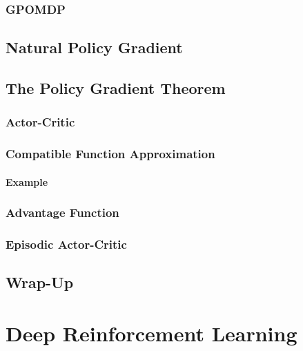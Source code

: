 		\subsection{GPOMDP} %

	\section{Natural Policy Gradient} %

	\section{The Policy Gradient Theorem} %

		\subsection{Actor-Critic} %

		\subsection{Compatible Function Approximation} %

			\subsubsection{Example} %

		\subsection{Advantage Function} %

		\subsection{Episodic Actor-Critic} %

	\section{Wrap-Up} %

\chapter{Deep Reinforcement Learning} %

